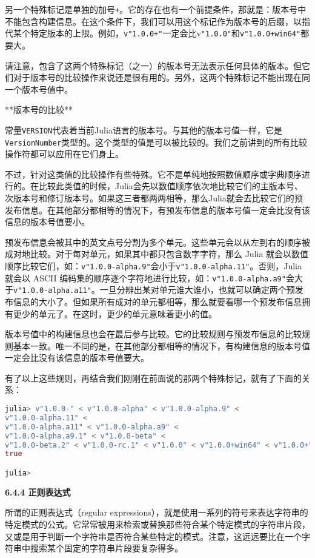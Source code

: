 另一个特殊标记是单独的加号\verb`+`。它的存在也有一个前提条件，那就是：版本号中不能包含构建信息。在这个条件下，我们可以用这个标记作为版本号的后缀，以指代某个特定版本的上限。例如，\verb`v"1.0.0+"`一定会比v\verb`"1.0.0"`和\verb`v"1.0.0+win64"`都要大。

请注意，包含了这两个特殊标记（之一）的版本号无法表示任何具体的版本。但它们对于版本号的比较操作来说还是很有用的。另外，这两个特殊标记不能出现在同一个版本号值中。

**版本号的比较**

常量\verb`VERSION`代表着当前Julia语言的版本号。与其他的版本号值一样，它是\verb`VersionNumber`类型的。这个类型的值是可以被比较的。我们之前讲到的所有比较操作符都可以应用在它们身上。

不过，针对这类值的比较操作有些特殊。它不是单纯地按照数值顺序或字典顺序进行的。在比较此类值的时候，Julia会先以数值顺序依次地比较它们的主版本号、次版本号和修订版本号。如果这三者都两两相等，那么Julia就会去比较它们的预发布信息。在其他部分都相等的情况下，有预发布信息的版本号值一定会比没有该信息的版本号值要小。

预发布信息会被其中的英文点号分割为多个单元。这些单元会以从左到右的顺序被成对地比较。对于每对单元，如果其中都只包含数字字符，那么 Julia 就会以数值顺序比较它们，如：\verb`v"1.0.0-alpha.9"`会小于\verb`v"1.0.0-alpha.11"`。否则，Julia 就会以 ASCII 编码集的顺序逐个字符地进行比较，如：\verb`v"1.0.0-alpha.a9"`会大于\verb`v"1.0.0-alpha.a11"`。一旦分辨出某对单元谁大谁小，也就可以确定两个预发布信息的大小了。但如果所有成对的单元都相等，那么就要看哪一个预发布信息拥有更少的单元了。在这时，更少的单元意味着更小的值。

版本号值中的构建信息也会在最后参与比较。它的比较规则与预发布信息的比较规则基本一致。唯一不同的是，在其他部分都相等的情况下，有构建信息的版本号值一定会比没有该信息的版本号值要大。

有了以上这些规则，再结合我们刚刚在前面说的那两个特殊标记，就有了下面的关系：
\begin{lstlisting}[language=julia]
julia> v"1.0.0-" < v"1.0.0-alpha" < v"1.0.0-alpha.9" < 
v"1.0.0-alpha.11" < 
v"1.0.0-alpha.a11" < v"1.0.0-alpha.a9" < 
v"1.0.0-alpha.a9.1" < v"1.0.0-beta" < 
v"1.0.0-beta.2" < v"1.0.0-rc.1" < v"1.0.0" < v"1.0.0+win64" < v"1.0.0+"
true

julia> 
\end{lstlisting}

\textbf{6.4.4 正则表达式}

所谓的正则表达式（regular expressions），就是使用一系列的符号来表达字符串的特定模式的公式。它常常被用来检索或替换那些符合某个特定模式的字符串片段，又或是用于判断一个字符串是否符合某些特定的模式。注意，这远远要比在一个字符串中搜索某个固定的字符串片段要复杂得多。

